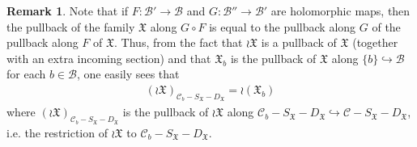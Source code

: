 \documentclass[11pt,b5paper,notitlepage]{article}
\theoremstyle{definition}
\newtheorem{rem}[df]{Remark}
\theoremstyle{plain}
\newcommand{\fk}{\mathfrak}
\newcommand{\mc}{\mathcal}
\newcommand{\SX}{{S_{\fk X}}}
\newcommand{\DX}{D_{\fk X}}
\newcommand{\<}{\left\langle}
\renewcommand{\>}{\right\rangle}
\newcommand{\MC}{\mathcal{C}}
\newcommand{\MB}{\mathcal{B}}
\newcommand{\fx}{\mathfrak{X}}
\numberwithin{equation}{section}
\begin{document}

\begin{rem}\label{fiberpropagation}
Note that if $F:\mc B'\rightarrow\mc B$ and $G:\mc B''\rightarrow\mc B'$ are holomorphic maps, then the pullback of the family $\fk X$ along $G\circ F$ is equal to the pullback along $G$ of the pullback along $F$ of $\fk X$. Thus, from the fact that $\wr\fk X$ is a pullback of $\fk X$ (together with an extra incoming section) and that $\fk X_b$ is the pullback of $\fk X$ along $\{b\}\hookrightarrow \mc B$ for each $b\in\mc B$, one easily sees that
\begin{align}
(\wr\fk X)_{\mc C_b-\SX-\DX}=\wr(\fx_b)  \label{eq58}
\end{align}
where $(\wr\fk X)_{\mc C_b-\SX-\DX}$ is the pullback of $\wr\fk X$ along $\mc C_b-\SX-\DX\hookrightarrow\mc C-\SX-\DX$, i.e. the restriction of $\wr\fk X$ to $\mc C_b-\SX-\DX$.
\end{rem}
\end{document}
